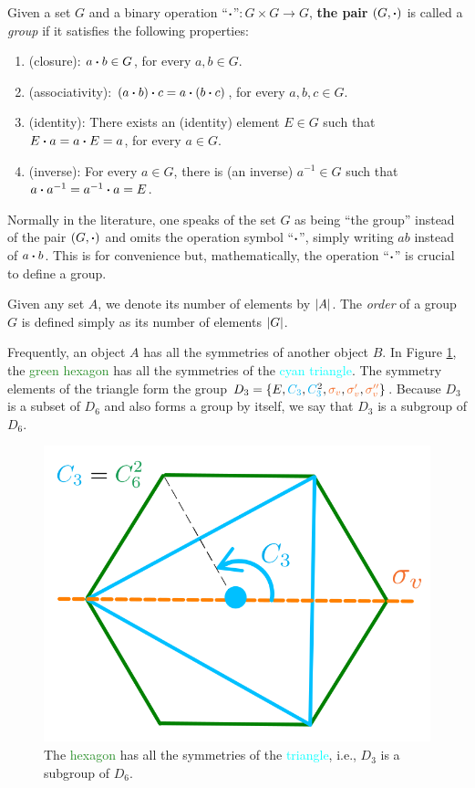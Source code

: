 \begin{definition} \label{def:group}
Given a set $G$ and a binary operation ``$\vdot$''$:G\times G \to G$, \textbf{the pair} $(G, \vdot)$ is called a \textit{group} if it satisfies the following properties:
\begin{enumerate}
\item (closure): $a \vdot b \in G$, for every $a, b \in G$.
\item (associativity): $(a \vdot b) \vdot c =  a \vdot (b \vdot c)$, for every $a, b, c \in G$.
\item (identity): There exists an (identity) element $E \in G$ such that $E \vdot a = a \vdot E = a$, for every $a \in G$.
\item (inverse): For every $a \in G$, there is (an inverse) $a^{-1} \in G$ such that $a \vdot a^{-1} = a^{-1} \vdot a = E$.
\end{enumerate}
\end{definition}
Normally in the literature, one speaks of the set $G$ as being ``the group'' instead of the pair $(G, \vdot)$ and omits the operation symbol ``$\vdot$'', simply writing $ab$ instead of $a \vdot b$. This is for convenience but, mathematically, the operation ``$\vdot$'' is crucial to define a group.

\begin{definition} \label{def:group_order}
Given any set $A$, we denote its number of elements by $\abs{A}$. The \textit{order} of a group $G$ is defined simply as its number of elements $\abs{G}$.
\end{definition}

\begin{example} \label{ex:subgroup_example_D3D6}
Frequently, an object $A$ has all the symmetries of another object $B$. In Figure \ref{fig:hexagon_subgroup}, the \textcolor{ForestGreen}{green hexagon} has all the symmetries of the \textcolor{Cyan}{cyan triangle}. The symmetry elements of the triangle form the group $D_3 = \{E, \Ct, \Ctn{2}, \sv, \svp, \svpp\}$. Because $D_3$ is a subset of $D_6$ and also forms a group by itself, we say that $D_3$ is a subgroup of $D_6$.
\end{example}

\begin{figure}[H]
\centering
\includegraphics[width=0.4\linewidth]{fig/hexagon_subgroup.png}
\caption{The \textcolor{ForestGreen}{hexagon} has all the symmetries of the \textcolor{Cyan}{triangle}, i.e., $D_3$ is a subgroup of $D_6$.}
\label{fig:hexagon_subgroup}
\end{figure}


